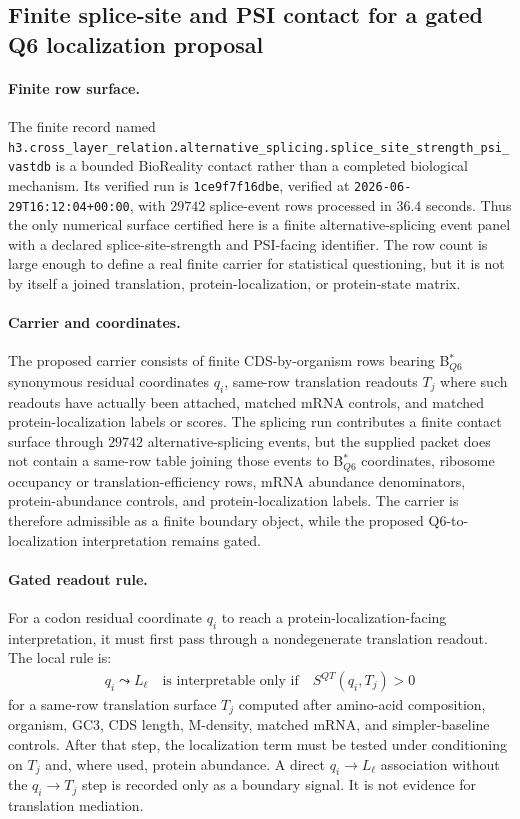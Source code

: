 \subsection{Finite splice-site and PSI contact for a gated Q6 localization proposal}\label{subsec:h3-cross-layer-relation-alternative-splicing-splice-site-strength-psi-vastdb}

\paragraph{Finite row surface.}
The finite record named \texttt{h3.cross\_layer\_relation.alternative\_splicing.splice\_site\_strength\_psi\_vastdb} is a bounded BioReality contact rather than a completed biological mechanism.  Its verified run is \texttt{1ce9f7f16dbe}, verified at \texttt{2026-06-29T16:12:04+00:00}, with $29742$ splice-event rows processed in $36.4$ seconds.  Thus the only numerical surface certified here is a finite alternative-splicing event panel with a declared splice-site-strength and PSI-facing identifier.  The row count is large enough to define a real finite carrier for statistical questioning, but it is not by itself a joined translation, protein-localization, or protein-state matrix.

\paragraph{Carrier and coordinates.}
The proposed carrier consists of finite CDS-by-organism rows bearing B$^{\ast}_{Q6}$ synonymous residual coordinates $q_i$, same-row translation readouts $T_j$ where such readouts have actually been attached, matched mRNA controls, and matched protein-localization labels or scores.  The splicing run contributes a finite contact surface through $29742$ alternative-splicing events, but the supplied packet does not contain a same-row table joining those events to B$^{\ast}_{Q6}$ coordinates, ribosome occupancy or translation-efficiency rows, mRNA abundance denominators, protein-abundance controls, and protein-localization labels.  The carrier is therefore admissible as a finite boundary object, while the proposed Q6-to-localization interpretation remains gated.

\paragraph{Gated readout rule.}
For a codon residual coordinate $q_i$ to reach a protein-localization-facing interpretation, it must first pass through a nondegenerate translation readout.  The local rule is:
$$
\begin{aligned}
q_i \leadsto L_\ell \quad \text{is interpretable only if} \quad
S^{QT}(q_i,T_j) > 0
\end{aligned}
$$
for a same-row translation surface $T_j$ computed after amino-acid composition, organism, GC3, CDS length, M-density, matched mRNA, and simpler-baseline controls.  After that step, the localization term must be tested under conditioning on $T_j$ and, where used, protein abundance.  A direct $q_i \to L_\ell$ association without the $q_i \to T_j$ step is recorded only as a boundary signal.  It is not evidence for translation mediation.

